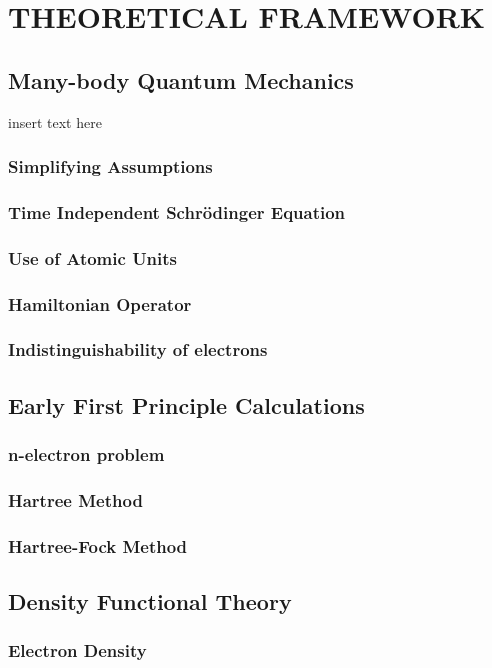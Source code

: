 \chapter{THEORETICAL FRAMEWORK}
\section{Many-body Quantum Mechanics}
insert text here
    \subsection{Simplifying Assumptions}
    \subsection{Time Independent Schr{\"o}dinger Equation}
    \subsection{Use of Atomic Units}
    \subsection{Hamiltonian Operator}
\subsection{Indistinguishability of electrons}
\section{Early First Principle Calculations}
    \subsection{n-electron problem}
    \subsection{Hartree Method}
    \subsection{Hartree-Fock Method}
\section{Density Functional Theory}
    \subsection{Electron Density}
